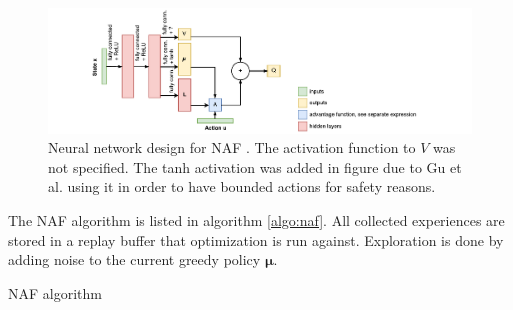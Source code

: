 \begin{figure}[h]
    \centering
    \includegraphics[width=1.0\textwidth]{res/naf-net.pdf}

    \caption{Neural network design for NAF \cite{gu2016continuous}. The
    activation function to $V$ was not specified. The tanh activation was added
    in figure due to Gu et al. \cite{gu2016deep} using it in order to have
    bounded actions for safety reasons.}

    \label{fig:naf-net}
\end{figure}

The NAF algorithm is listed in algorithm \ref{algo:naf}. All collected experiences
are stored in a replay buffer that optimization is run against. Exploration is done
by adding noise to the current greedy policy $\mathbf{\mu}$.

\begin{algorithm}[!h]
    \caption{NAF algorithm}
    \begin{algorithmic}
                \ENDFOR
            \ENDFOR
        \ENDFOR
    \end{algorithmic}
    \label{algo:naf}
\end{algorithm}

